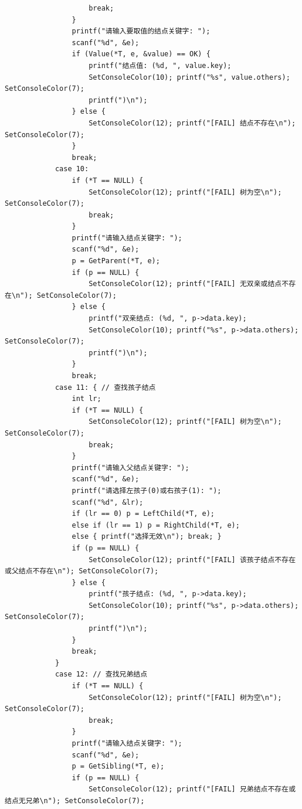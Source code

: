 \documentclass[supercite]{Experimental_Report}
\begin{document}
{\begin{lstlisting}
                    break;
                }
                printf("请输入要取值的结点关键字: ");
                scanf("%d", &e);
                if (Value(*T, e, &value) == OK) {
                    printf("结点值: (%d, ", value.key);
                    SetConsoleColor(10); printf("%s", value.others); SetConsoleColor(7);
                    printf(")\n");
                } else {
                    SetConsoleColor(12); printf("[FAIL] 结点不存在\n"); SetConsoleColor(7);
                }
                break;
            case 10:
                if (*T == NULL) {
                    SetConsoleColor(12); printf("[FAIL] 树为空\n"); SetConsoleColor(7);
                    break;
                }
                printf("请输入结点关键字: ");
                scanf("%d", &e);
                p = GetParent(*T, e);
                if (p == NULL) {
                    SetConsoleColor(12); printf("[FAIL] 无双亲或结点不存在\n"); SetConsoleColor(7);
                } else {
                    printf("双亲结点: (%d, ", p->data.key);
                    SetConsoleColor(10); printf("%s", p->data.others); SetConsoleColor(7);
                    printf(")\n");
                }
                break;
            case 11: { // 查找孩子结点
                int lr;
                if (*T == NULL) {
                    SetConsoleColor(12); printf("[FAIL] 树为空\n"); SetConsoleColor(7);
                    break;
                }
                printf("请输入父结点关键字: ");
                scanf("%d", &e);
                printf("请选择左孩子(0)或右孩子(1): ");
                scanf("%d", &lr);
                if (lr == 0) p = LeftChild(*T, e);
                else if (lr == 1) p = RightChild(*T, e);
                else { printf("选择无效\n"); break; }
                if (p == NULL) {
                    SetConsoleColor(12); printf("[FAIL] 该孩子结点不存在或父结点不存在\n"); SetConsoleColor(7);
                } else {
                    printf("孩子结点: (%d, ", p->data.key);
                    SetConsoleColor(10); printf("%s", p->data.others); SetConsoleColor(7);
                    printf(")\n");
                }
                break;
            }
            case 12: // 查找兄弟结点
                if (*T == NULL) {
                    SetConsoleColor(12); printf("[FAIL] 树为空\n"); SetConsoleColor(7);
                    break;
                }
                printf("请输入结点关键字: ");
                scanf("%d", &e);
                p = GetSibling(*T, e);
                if (p == NULL) {
                    SetConsoleColor(12); printf("[FAIL] 兄弟结点不存在或结点无兄弟\n"); SetConsoleColor(7);

\end{lstlisting}}
\end{document}
